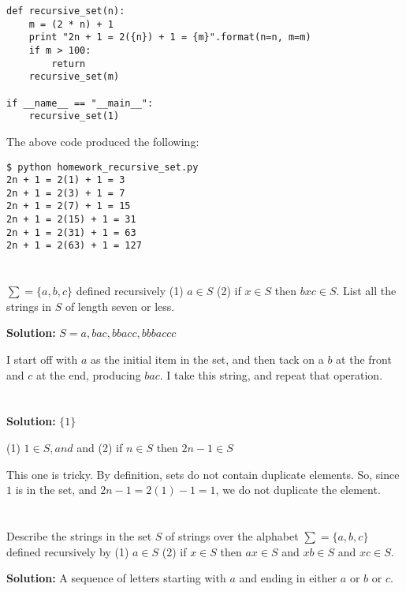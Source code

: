 \documentclass{article}
\begin{document}
\begin{lstlisting}
def recursive_set(n):
    m = (2 * n) + 1
    print "2n + 1 = 2({n}) + 1 = {m}".format(n=n, m=m)
    if m > 100:
        return
    recursive_set(m)

if __name__ == "__main__":
    recursive_set(1)
\end{lstlisting}

The above code produced the following:
\begin{lstlisting}
$ python homework_recursive_set.py 
2n + 1 = 2(1) + 1 = 3
2n + 1 = 2(3) + 1 = 7
2n + 1 = 2(7) + 1 = 15
2n + 1 = 2(15) + 1 = 31
2n + 1 = 2(31) + 1 = 63
2n + 1 = 2(63) + 1 = 127
\end{lstlisting}

\section{}

$\sum = \{a,b,c\}$ defined recursively (1) $a \in S$ (2) if $x \in S$ then $bxc \in S$. List all the strings in $S$ of length seven or less.

\textbf{Solution:}  $S = a, bac, bbacc, bbbaccc$

I start off with $a$ as the initial item in the set, and then tack on a $b$ at the front and $c$ at the end, producing $bac$.  I take this string, and repeat that operation.



\section{}
\textbf{Solution: } $\{1\}$

(1) $1 \in S, and $ and (2) if $n \in S$ then $2n - 1 \in S$

This one is tricky. By definition, sets do not contain duplicate elements. So, since $1$ is in the set, and $2n -1 = 2(1) - 1 = 1$, we do not duplicate the element.

\section{}

Describe the strings in the set $S$ of strings over the alphabet $\sum = \{a,b,c\}$ defined recursively by (1) $a \in S$ (2) if $x \in S$ then $ax \in S$ and $xb \in S$ and $xc \in S$.

\textbf{Solution: } A sequence of letters starting with $a$ and ending in either $a$ or $b$ or $c$.
\end{document}

